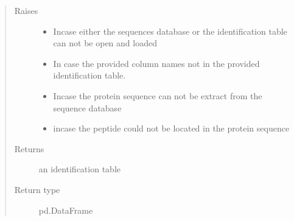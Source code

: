 \documentclass[letterpaper,10pt,english]{sphinxmanual}
\begin{document}
\begin{fulllineitems}
\begin{quote}
\begin{description}
\begin{itemize}
\end{itemize}

\item[{Raises}] \leavevmode\begin{itemize}
\item {} 
 \textendash{} Incase either the sequences database or the identification table can not be open and loaded

\item {} 
 \textendash{} In case the provided column names not in the provided identification table.

\item {} 
 \textendash{} Incase the protein sequence can not be extract from the sequence database

\item {} 
 \textendash{} incase the peptide could not be located in the protein sequence

\end{itemize}

\item[{Returns}] \leavevmode
an identification table

\item[{Return type}] \leavevmode
pd.DataFrame

\end{description}\end{quote}

\end{fulllineitems}

\end{document}

